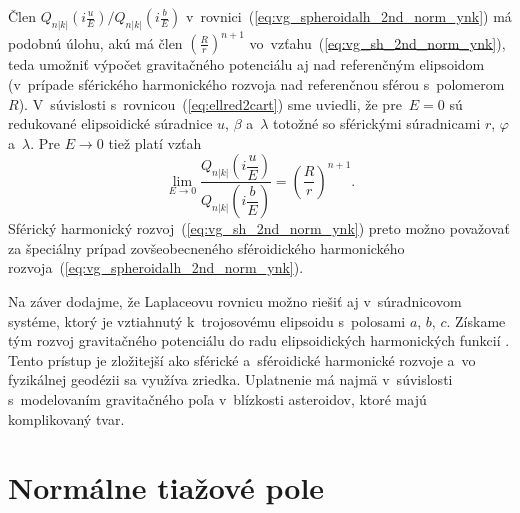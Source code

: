 \documentclass[a4paper,12pt]{book}
\begin{document}
Člen $Q_{n|k|}\left( i \frac{u}{E} \right) \slash Q_{n|k|}\left( i \frac{b}{E} 
\right)$ v~rovnici~(\ref{eq:vg_spheroidalh_2nd_norm_ynk}) má podobnú úlohu, akú 
má člen $\left( \frac{R}{r} \right)^{n + 1}$ 
vo~vzťahu~(\ref{eq:vg_sh_2nd_norm_ynk}), teda umožniť výpočet gravitačného 
potenciálu aj nad referenčným elipsoidom (v~prípade sférického harmonického 
rozvoja nad referenčnou sférou s~polomerom~$R$).  V~súvislosti 
s~rovnicou~(\ref{eq:ellred2cart}) sme uviedli, že pre~$E = 0$ sú redukované 
elipsoidické súradnice $u$, $\beta$ a~$\lambda$ totožné so sférickými 
súradnicami $r$, $\varphi$ a~$\lambda$.  Pre $E \rightarrow 0$ tiež platí vzťah 
\parencite{MoritzPhysicalGeodesy}
%
\begin{equation}
\lim_{E \rightarrow 0} \frac{Q_{n|k|}\left( i \dfrac{u}{E} 
\right)}{Q_{n|k|}\left( i \dfrac{b}{E} \right)} = \left( \frac{R}{r} \right)^{n 
+ 1}{.}
\end{equation}
%
Sférický harmonický rozvoj~(\ref{eq:vg_sh_2nd_norm_ynk}) preto možno považovať 
za špeciálny prípad zovšeobecneného sféroidického harmonického 
rozvoja~(\ref{eq:vg_spheroidalh_2nd_norm_ynk}).

Na záver dodajme, že Laplaceovu rovnicu možno riešiť aj v~súradnicovom systéme, 
ktorý je vztiahnutý k~trojosovému elipsoidu s~polosami $a$, $b$, $c$.  Získame 
tým rozvoj gravitačného potenciálu do radu elipsoidických harmonických funkcií 
\parencite[napríklad][]{Garmier2001,Hu2015,Reimond2016}.  Tento prístup je 
zložitejší ako sférické a~sféroidické harmonické rozvoje a~vo fyzikálnej 
geodézii sa využíva zriedka.  Uplatnenie má najmä v~súvislosti s~modelovaním 
gravitačného poľa v~blízkosti asteroidov, ktoré majú komplikovaný tvar.










\chapter{Normálne tiažové pole}
\label{sec:normal_gravity_field}
\end{document}
